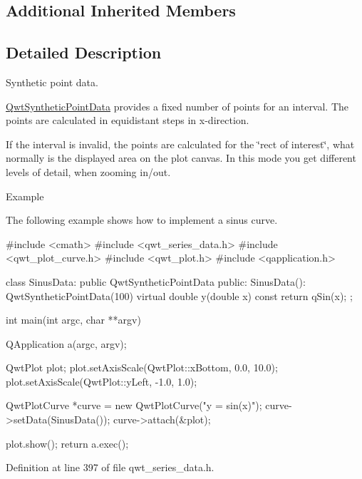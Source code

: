 \subsection*{Additional Inherited Members}


\subsection{Detailed Description}
Synthetic point data. 

\hyperlink{class_qwt_synthetic_point_data}{Qwt\-Synthetic\-Point\-Data} provides a fixed number of points for an interval. The points are calculated in equidistant steps in x-\/direction.

If the interval is invalid, the points are calculated for the \char`\"{}rect of interest\char`\"{}, what normally is the displayed area on the plot canvas. In this mode you get different levels of detail, when zooming in/out.

\begin{DoxyParagraph}{Example}

\end{DoxyParagraph}
The following example shows how to implement a sinus curve.

\begin{DoxyVerb}#include <cmath>
#include <qwt_series_data.h>
#include <qwt_plot_curve.h>
#include <qwt_plot.h>
#include <qapplication.h>

class SinusData: public QwtSyntheticPointData
{
public:
    SinusData():
        QwtSyntheticPointData(100)
    {
    }
    virtual double y(double x) const
    {
        return qSin(x);
    }
};

int main(int argc, char **argv)
{
    QApplication a(argc, argv);

    QwtPlot plot;
    plot.setAxisScale(QwtPlot::xBottom, 0.0, 10.0);
    plot.setAxisScale(QwtPlot::yLeft, -1.0, 1.0);

    QwtPlotCurve *curve = new QwtPlotCurve("y = sin(x)");
    curve->setData(SinusData());
    curve->attach(&plot);

    plot.show();
    return a.exec();
}\end{DoxyVerb}
 

Definition at line 397 of file qwt\-\_\-series\-\_\-data.\-h.



